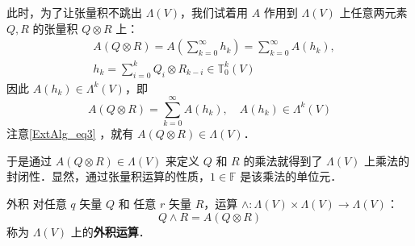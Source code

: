 此时，为了让张量积不跳出 $\Lambda(V)$，我们试着用 $A$ 作用到 $\Lambda(V)$ 上任意两元素 $Q,R$ 的张量积 $Q\otimes R$ 上：
\begin{equation}
\begin{aligned}
&A(Q\otimes R)=A(\sum_{k=0}^\infty h_k)=\sum_{k=0}^\infty  A(h_k),\\
&h_k=\sum_{i=0}^k Q_i\otimes R_{k-i}\in\mathbb T_0^k(V)
\end{aligned}
\end{equation}
因此 $A(h_k)\in \Lambda^{k}(V)$，即
\begin{equation}
A(Q\otimes R)=\sum_{k=0}^\infty  A(h_k),\quad A(h_k)\in\Lambda^k(V)
\end{equation}
注意\autoref{ExtAlg_eq3} ，就有 $A(Q\otimes R)\in\Lambda(V)$．

于是通过 $A(Q\otimes R)\in\Lambda(V)$ 来定义 $Q$ 和 $R$ 的乘法就得到了 $\Lambda(V)$ 上乘法的封闭性．显然，通过张量积运算的性质，$1\in\mathbb F$ 是该乘法的单位元．
\begin{definition}{外积}\label{ExtAlg_def1}
对任意 $q$ 矢量 $Q$ 和 任意 $r$ 矢量 $R$，运算 $\wedge:\Lambda(V)\times\Lambda(V)\rightarrow\Lambda(V)$：
\begin{equation}
Q\wedge R=A(Q\otimes R)
\end{equation}
称为 $\Lambda(V)$ 上的\textbf{外积运算}．
\end{definition}
